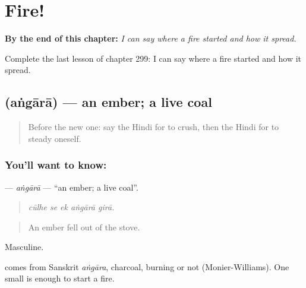 
\chapter{Fire!}
\label{ch:hi-fire}

\begin{chapteropening}
\textbf{By the end of this chapter:} \emph{I can say where a fire started and how it spread.}

Complete the last lesson of chapter 299: I can say where a fire started and how it spread.
\end{chapteropening}

\section[\texorpdfstring{\hi{अंगारा} (aṅgārā)}{अंगारा (aṅgārā)}]{ (aṅgārā) — an ember; a live coal}

\label{lesson:HI-C299-angara}



\begin{quote}
Before the new one: say the Hindi for to crush, then the Hindi for to steady oneself.
\end{quote}

\subsection*{You'll want to know: }
\textbf{} — \emph{aṅgārā} — \textquotedblleft{}an ember; a live coal\textquotedblright{}.

\begin{quote}
    
\end{quote}

\begin{quote}
\emph{cūlhe se ek aṅgārā girā.}
\end{quote}

\begin{quote}
An ember fell out of the stove.
\end{quote}

Masculine.

\begin{cousinweb}
comes from Sanskrit \emph{aṅgāra}, charcoal, burning or not (Monier-Williams). One small \textbf{} is enough to start a fire.
\end{cousinweb}

